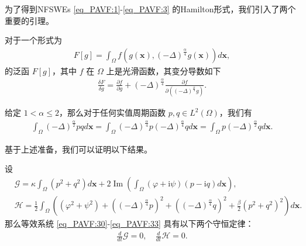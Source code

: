 为了得到NFSWEs \eqref{eq_PAVF:1}-\eqref{eq_PAVF:3} 的Hamilton形式，我们引入了两个重要的引理。

\begin{lemma}\label{lem_PAVF:2}
 对于一个形式为
\begin{align}\label{eq_PAVF:25}
F[g]=\int_{\Omega} f\left(g(\boldsymbol{x}),(-\Delta)^{\frac{\alpha}{4}} g(\boldsymbol{x})\right) d \boldsymbol{x},
\end{align}
的泛函 $F[g]$，其中 $f$ 在 $\Omega$ 上是光滑函数，其变分导数如下
\begin{align}\label{eq_PAVF:26}
\frac{\delta F}{\delta g}=\frac{\partial f}{\partial g}+(-\Delta)^{\frac{\alpha}{4}} \frac{\partial f}{\partial\left((-\Delta)^{\frac{\alpha}{4}} g\right)} .
\end{align}
\end{lemma}

\begin{lemma}\label{lem_PAVF:1}
 给定 $1<\alpha \leq 2$，那么对于任何实值周期函数 $p, q \in L^{2}(\Omega)$，我们有
\begin{align}\label{eq_PAVF:22}
\int_{\Omega}(-\Delta)^{\frac{\alpha}{2}} p q d \boldsymbol{x}=\int_{\Omega}(-\Delta)^{\frac{\alpha}{4}} p(-\Delta)^{\frac{\alpha}{4}} q d \boldsymbol{x}=\int_{\Omega} p(-\Delta)^{\frac{\alpha}{2}} q d \boldsymbol{x}.
\end{align}
\end{lemma}

基于上述准备，我们可以证明以下结果。

\begin{theorem}	\label{thm_PAVF:2_1}
设
\begin{align}
&\mathcal{G}=\kappa\int_{\Omega}(p^2+q^2) d \boldsymbol{x}+2\operatorname{Im}(\int_{\Omega}(\varphi+\mathrm{i}\psi)(p-\mathrm{i}q)d \boldsymbol{x}),\label{eq_PAVF:34} \\
&\mathcal{H}=\frac{1}{2}\int_{\Omega}\left((\varphi^2+\psi^2)+\left((-\Delta)^{\frac{\alpha}{4}} p\right)^{2}+\left((-\Delta)^{\frac{\alpha}{4}} q\right)^{2}+\frac{\beta}{2}(p^2+q^2)^{2}\right) d \boldsymbol{x}.\label{eq_PAVF:35}
\end{align}
那么等效系统 \eqref{eq_PAVF:30}-\eqref{eq_PAVF:33} 具有以下两个守恒定律：
\begin{align}
\frac{d}{d t} \mathcal{G}=0, \quad \frac{d}{d t} \mathcal{H}=0.
\end{align}
\end{theorem}

